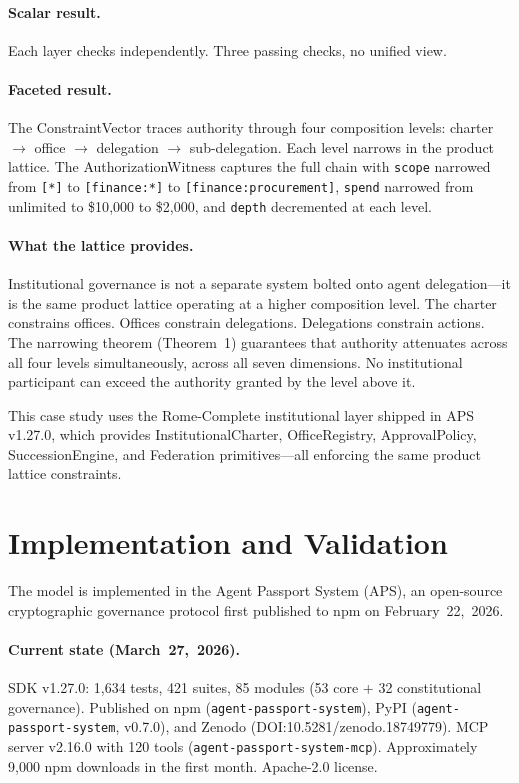 \documentclass[sigconf,nonacm]{acmart}
\begin{document}
\paragraph{Scalar result.} Each layer checks independently. Three passing checks, no
unified view.

\paragraph{Faceted result.} The ConstraintVector traces authority through four composition
levels: charter $\to$ office $\to$ delegation $\to$ sub-delegation. Each level narrows in
the product lattice. The AuthorizationWitness captures the full chain with
\texttt{scope} narrowed from \texttt{[*]} to \texttt{[finance:*]} to
\texttt{[finance:procurement]}, \texttt{spend} narrowed from unlimited to \$10{,}000 to
\$2{,}000, and \texttt{depth} decremented at each level.

\paragraph{What the lattice provides.} Institutional governance is not a separate system
bolted onto agent delegation---it is the same product lattice operating at a higher
composition level. The charter constrains offices. Offices constrain delegations.
Delegations constrain actions. The narrowing theorem (Theorem~1) guarantees that authority
attenuates across all four levels simultaneously, across all seven dimensions. No
institutional participant can exceed the authority granted by the level above it.

This case study uses the Rome-Complete institutional layer shipped in APS v1.27.0,
which provides InstitutionalCharter, OfficeRegistry, ApprovalPolicy, SuccessionEngine,
and Federation primitives---all enforcing the same product lattice constraints.

\section{Implementation and Validation}

The model is implemented in the Agent Passport System (APS), an open-source cryptographic
governance protocol first published to npm on February~22,~2026.

\paragraph{Current state (March~27,~2026).} SDK v1.27.0: 1,634 tests, 421 suites,
85 modules (53 core + 32 constitutional governance). Published on npm
(\texttt{agent-passport-system}), PyPI (\texttt{agent-passport-system}, v0.7.0), and
Zenodo (DOI:10.5281/zenodo.18749779). MCP server v2.16.0 with 120 tools
(\texttt{agent-passport-system-mcp}). Approximately 9{,}000 npm downloads in the first
month. Apache-2.0 license.
\end{document}
